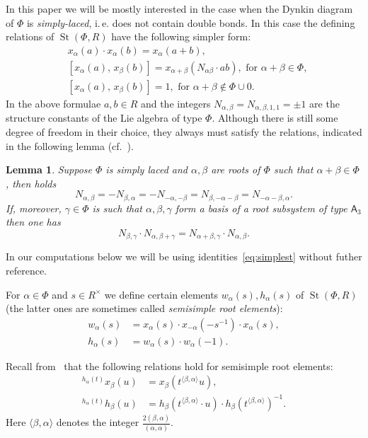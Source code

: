 \documentclass[oneside, 8pt]{amsart}
\newtheorem{lemma}{Lemma}
\theoremstyle{remark}
\theoremstyle{definition}
\numberwithin{lemma}{section}
\numberwithin{prop}{section}
\numberwithin{corollary}{section}
\numberwithin{externaltheorem}{section}
\DeclareMathOperator{\St}{St}
\newcommand{\rA}{\mathsf{A}}
\numberwithin{equation}{section}
\begin{document}
In this paper we will be mostly interested in the case when the Dynkin diagram of $\Phi$ is {\it simply-laced}, i.\,e. does not contain double bonds. In this case the defining relations of $\St(\Phi, R)$ have the following simpler form:
\begin{align}
&x_{\alpha}(a)\cdot x_{\alpha}(b)=x_{\alpha}(a+b), \tag{R1}\\
&[x_{\alpha}(a),\,x_{\beta}(b)]=x_{\alpha+\beta}(N_{\alpha\beta} \cdot ab),\text{ for }\alpha+\beta\in\Phi, \tag{R2} \\
&[x_{\alpha}(a),\,x_{\beta}(b)]=1,\text{ for }\alpha+\beta\not\in\Phi\cup0. \tag{R3}
\end{align}
In the above formulae $a, b \in R$ and the integers $N_{\alpha, \beta} = N_{\alpha, \beta, 1, 1} = \pm 1$ are the structure constants of the Lie algebra of type $\Phi$. Although there is still some degree of freedom in their choice, they always must satisfy the relations, indicated in the following lemma (cf.~\cite[\S~14]{VP}). 
\begin{lemma} Suppose $\Phi$ is simply laced and $\alpha, \beta$ are roots of $\Phi$ such that $\alpha+\beta\in \Phi$, then holds
\begin{equation} \label{eq:simplest} N_{\alpha, \beta} = -N_{\beta,\alpha} = - N_{-\alpha, -\beta} = N_{\beta, -\alpha-\beta} = N_{-\alpha-\beta, \alpha}. \end{equation}
If, moreover, $\gamma \in \Phi$ is such that $\alpha,\beta,\gamma$ form a basis of a root subsystem of type $\rA_3$ then one has
\begin{equation} \label{eq:cocycle} N_{\beta,\gamma} \cdot N_{\alpha, \beta+\gamma} = N_{\alpha+\beta, \gamma} \cdot N_{\alpha, \beta}. \end{equation} \end{lemma}
In our computations below we will be using identities~\eqref{eq:simplest} without futher reference.

For $\alpha\in\Phi$ and $s \in R^\times$ we define certain elements $w_\alpha(s), h_\alpha(s)$ of $\St(\Phi, R)$ (the latter ones are sometimes called {\it semisimple root elements}):
\begin{align*} w_\alpha(s) & =  x_\alpha(s) \cdot x_{-\alpha}(-s^{-1}) \cdot x_\alpha(s), \\ h_\alpha(s) & =  w_\alpha(s) \cdot w_\alpha(-1).  \end{align*}

Recall from~\cite[Lemma~5.2]{Ma69} that the following relations hold for semisimple root elements:
\begin{align} \label{eq:conj-h-x} {}^{h_\alpha(t)}\!x_\beta(u) & = x_\beta(t^{\langle \beta,  \alpha \rangle}u), \\ \label{eq:conj-h-h} {}^{h_\alpha(t)}\!h_\beta(u) & = h_\beta(t^{\langle \beta, \alpha \rangle} \cdot u) \cdot h_\beta(t^{\langle \beta,  \alpha \rangle})^{-1}. \end{align}
Here $\langle \beta, \alpha \rangle$ denotes the integer $\tfrac{2(\beta, \alpha)}{(\alpha, \alpha)}$.
\end{document}
